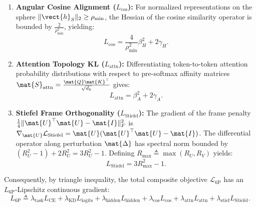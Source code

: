 \begin{lemma}
\begin{enumerate}
\begin{equation}
    L_{\text{hidden}} = 2 \left( \max_{\ell \in \{1,\dots,L\}} \|\mat{W}_{\text{proj}}^{(\ell)}\|_2^2 \right) \beta_H^2 + 2 \mathcal{R}_H \gamma_H,
    \label{eq:lipschitz_hidden}
    \end{equation}
    where $\mathcal{R}_H \triangleq \max_\ell \|\mat{H}_T^{(\ell)} - \mat{H}_S^{(\ell)} \mat{W}_{\text{proj}}^{(\ell)}\|_2$ bounds residual feature distortion.
    \item \textbf{Angular Cosine Alignment ($L_{\text{cos}}$):} For normalized representations on the sphere $\|\vect{h}_S\|_2 \ge \rho_{\min}$, the Hessian of the cosine similarity operator is bounded by $\frac{2}{\rho_{\min}^2}$, yielding:
    \begin{equation}
    L_{\text{cos}} = \frac{4}{\rho_{\min}^2} \beta_H^2 + 2 \gamma_H.
    \label{eq:lipschitz_cos}
    \end{equation}
    \item \textbf{Attention Topology KL ($L_{\text{attn}}$):} Differentiating token-to-token attention probability distributions with respect to pre-softmax affinity matrices $\mat{S}_{\text{attn}} = \frac{\mat{Q}\mat{K}^\top}{\sqrt{d_k}}$ gives:
    \begin{equation}
    L_{\text{attn}} = \beta_A^2 + 2 \gamma_A.
    \label{eq:lipschitz_attn}
    \end{equation}
    \item \textbf{Stiefel Frame Orthogonality ($L_{\text{Stiefel}}$):} The gradient of the frame penalty $\frac{1}{4} \|\mat{U}^\top \mat{U} - \mat{I}\|_F^2$ is $\nabla_{\mat{U}} \mathcal{L}_{\text{Stiefel}} = \mat{U}(\mat{U}^\top \mat{U} - \mat{I})$. The differential operator along perturbation $\mat{\Delta}$ has spectral norm bounded by $(R_U^2 - 1) + 2 R_U^2 = 3 R_U^2 - 1$. Defining $R_{\max} \triangleq \max(R_U, R_V)$ yields:
    \begin{equation}
    L_{\text{Stiefel}} = 3 R_{\max}^2 - 1.
    \label{eq:lipschitz_stiefel}
    \end{equation}
\end{enumerate}
Consequently, by triangle inequality, the total composite objective $\mathcal{L}_{\text{6P}}$ has an $L_{\text{6P}}$-Lipschitz continuous gradient:
\begin{equation}
L_{\text{6P}} \triangleq \lambda_{\text{task}} L_{\text{CE}} + \lambda_{\text{KD}} L_{\text{logits}} + \lambda_{\text{hidden}} L_{\text{hidden}} + \lambda_{\text{cos}} L_{\text{cos}} + \lambda_{\text{attn}} L_{\text{attn}} + \lambda_{\text{stief}} L_{\text{Stiefel}}.
\label{eq:composite_lipschitz_constant}
\end{equation}
\end{lemma}

